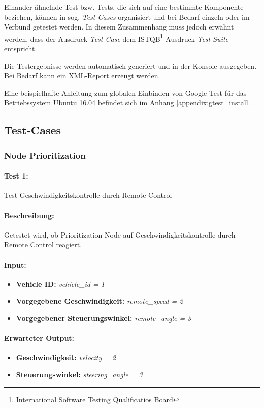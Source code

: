 \documentclass[a4paper, 12pt, titlepage]{scrartcl}
\begin{document}
		Einander ähnelnde Test bzw. Tests, die sich auf eine bestimmte Komponente beziehen, können in sog. \emph{Test Cases} 
		organisiert und bei Bedarf einzeln oder im Verbund getestet werden. In diesem Zusammenhang muss jedoch erwähnt werden, 
		dass der Ausdruck \emph{Test Case} dem ISTQB\footnote{International Software Testing Qualificatios Board}-Ausdruck 
		\emph{Test Suite} entspricht\cite{google}. 
		
		Die Testergebnisse werden automatisch generiert und in der Konsole ausgegeben. Bei Bedarf kann ein XML-Report erzeugt werden. 
		
		Eine beispielhafte Anleitung zum globalen Einbinden von Google Test für das Betriebssystem Ubuntu 16.04 befindet sich im Anhang \ref{appendix:gtest_install}. 
		
		
		\subsection{Test-Cases}
		\label{test_cases}
			\subsubsection{Node Prioritization}
			\label{node_prioritization}
				\paragraph{Test 1:}{Test Geschwindigkeitskontrolle durch Remote Control}
				\paragraph{Beschreibung:} Getestet wird, ob Prioritization Node auf Geschwindigkeitskontrolle durch Remote Control reagiert.
				\paragraph{Input:}
				\begin{itemize} \itemsep-0.5em
					\item \textbf{Vehicle ID:} \emph{vehicle\_id = 1}
					\item \textbf{Vorgegebene Geschwindigkeit:} \emph{remote\_speed = 2}
					\item \textbf{Vorgegebener Steuerungswinkel:} \emph{remote\_angle = 3}
				\end{itemize}
				\paragraph{Erwarteter Output:}
				\begin{itemize} \itemsep-0.5em
					\item \textbf{Geschwindigkeit:} \emph{velocity = 2}
					\item \textbf{Steuerungswinkel:} \emph{steering\_angle = 3}
				\end{itemize}
\end{document}
